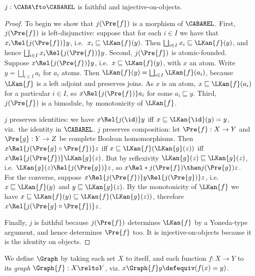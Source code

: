 \documentclass[a4paper,UKenglish,cleveref, autoref]{lipics-v2021}
\begin{document}
\begin{lemma}
  \label{lemma:j-faithful}
  \(j : \CABA \fto \CABAREL\) is faithful and injective-on-objects.
\end{lemma}
\begin{proof}
  To begin we show that \(j(\Pre{f})\) is a morphism of \(\CABAREL\). First,
  \(j(\Pre{f})\) is left-disjunctive: suppose that for each \(i \in I\) we have
  that \(x_i \Rel{j(\Pre{f})} y\), i.e.\ \(x_i \sqsubseteq \LKan{f}(y)\). Then
  \(\bigsqcup_{i \in I} x_i \sqsubseteq \LKan{f}(y)\), and hence \(\bigsqcup_{i
  \in I} x_i \Rel{j(\Pre{f})} y\).
  Second, \(j(\Pre{f})\) is atomic-founded. Suppose \(x \Rel{j(\Pre{f})} y\),
  i.e.\ \(x \sqsubseteq \LKan{f}(y)\), with \(x\) an atom. Write $y =
  \bigsqcup_{i \in I} a_i$ for $a_i$ atoms. Then $\LKan{f}(y) = \bigsqcup_{i \in
  I} \LKan{f}(a_i)$, because $\LKan{f}$ is a left adjoint and preserves joins.
  As \(x\) is an atom, $x \sqsubseteq \LKan{f}(a_i)$ for a particular $i \in I$, so $x
  \Rel{j(\Pre{f})} a_i$ for some $a_i \sqsubseteq y$.
  Third, $j(\Pre{f})$ is a bimodule, by monotonicity of $\LKan{f}$.

  $j$ preserves identities: we have \(x \Rel{j(\id)} y\) iff \(x \sqsubseteq
  \LKan{\id}(y) = y\), viz.\ the identity in \(\CABAREL\). $j$ preserves
  composition: let \(\Pre{f} : X \to Y\) and \(\Pre{g} : Y \to Z\) be complete
  Boolean homomorphisms. Then
  \(x \Rel{j(\Pre{g} \circ \Pre{f})} z\)
  iff
  \(x \sqsubseteq \LKan{f}(\LKan{g}(z))\)
  iff
  \(x \Rel{j(\Pre{f})} \LKan{g}(z)\).
  But by reflexivity
  $\LKan{g}(z) \sqsubseteq \LKan{g}(z)$,
  i.e.
  \(\LKan{g}(z) \Rel{j(\Pre{g})} z\),
  so
  \(x \Rel*{j(\Pre{f}) \then j(\Pre{g})} z\).
  For the converse, suppose
  \(x \Rel{j(\Pre{f})} y \Rel{j(\Pre{g})} z\),
  i.e.
  \(x \sqsubseteq \LKan{f}(y)\)
  and
  \(y \sqsubseteq \LKan{g}(z)\).
  By the monotonicity of \(\LKan{f}\) we have
  \(x \sqsubseteq \LKan{f}(y) \sqsubseteq \LKan{f}(\LKan{g}(z))\),
  therefore
  \(x \Rel{j({\Pre{g} \circ \Pre{f}})} z\).

  Finally, \(j\) is faithful because \(j(\Pre{f})\) determines \(\LKan{f}\) by a
  Yoneda-type argument, and hence determines \(\Pre{f}\) too. It is
  injective-on-objects because it is the identity on objects.
\end{proof}

We define $\Graph$ by taking each set $X$ to itself, and each function
\(f : X \to Y\) to its \emph{graph} \(\Graph{f} : X \relto Y\), viz.
\(x \Graph{f} y \defequiv (f(x) = y)\).
\end{document}
